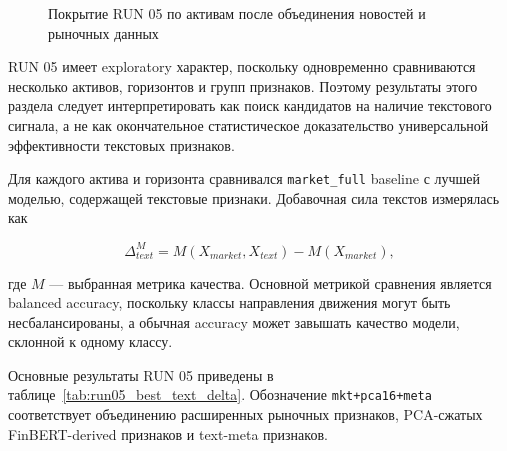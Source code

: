 \begin{figure}[htbp]
\centering
{}
\caption{Покрытие RUN 05 по активам после объединения новостей и рыночных данных}
\label{fig:run05_coverage_by_asset}
\end{figure}

RUN 05 имеет exploratory характер, поскольку одновременно сравниваются несколько активов, горизонтов и групп признаков. Поэтому результаты этого раздела следует интерпретировать как поиск кандидатов на наличие текстового сигнала, а не как окончательное статистическое доказательство универсальной эффективности текстовых признаков.

Для каждого актива и горизонта сравнивался \texttt{market\_full} baseline с лучшей моделью, содержащей текстовые признаки. Добавочная сила текстов измерялась как

\[
\Delta_{text}^{M}=M(X_{market},X_{text})-M(X_{market}),
\]

где $M$ --- выбранная метрика качества. Основной метрикой сравнения является balanced accuracy, поскольку классы направления движения могут быть несбалансированы, а обычная accuracy может завышать качество модели, склонной к одному классу.

Основные результаты RUN 05 приведены в таблице~\ref{tab:run05_best_text_delta}. Обозначение \texttt{mkt+pca16+meta} соответствует объединению расширенных рыночных признаков, PCA-сжатых FinBERT-derived признаков и text-meta признаков.

